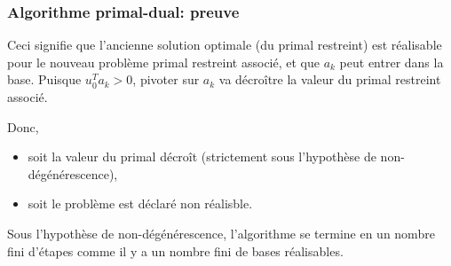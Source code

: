\documentclass[t,usepdftitle=false]{beamer}
\begin{document}
\begin{frame}
\frametitle{Algorithme primal-dual: preuve}

Ceci signifie que l'ancienne solution optimale (du primal restreint) est réalisable pour le nouveau problème primal restreint associé, et que $a_k$ peut entrer dans la base.
Puisque $u_0^T a_k > 0$, pivoter sur $a_k$ va décroître la valeur du primal restreint associé.

\mbox{}

Donc,
\begin{itemize}
\item
soit la valeur du primal décroît (strictement sous l'hypothèse de non-dégénérescence),
\item
soit le problème est déclaré non réalisble.
\end{itemize}

\mbox{}

Sous l'hypothèse de non-dégénérescence, l'algorithme se termine en un nombre fini d'étapes comme il y a un nombre fini de bases réalisables.

\end{frame}
\end{document}
